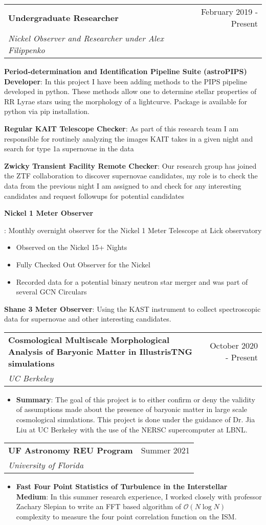 \documentclass[letterpaper,10pt]{article}
\makeatletter
\newcommand{\resumeItem}[2]{
  \item\small{
    \textbf{#1}{: #2 \vspace{-2pt}}
  }
}
\newcommand{\resumeSubheading}[4]{
  \vspace{-1pt}\item[]
  \begin{tabular*}{0.98\textwidth}{l@{\extracolsep{\fill}}r}
      \hspace{-10pt}\textbf{#1} & #2 \\
      \hspace{-10pt}\textit{\small#3} & \textit{\small #4} \\
    \end{tabular*}\vspace{-5pt}
}
\newcommand{\resumeItemListStart}{\begin{itemize}}
\newcommand{\resumeItemListEnd}{\end{itemize}\vspace{-5pt}}
\makeatother
\begin{document}
    \resumeSubheading
      {Undergraduate Researcher}{February 2019 - Present}
      {Nickel Observer and Researcher under Alex Filippenko}{}
      \resumeItemListStart
        \resumeItem{Period-determination and Identification Pipeline Suite (astroPIPS) Developer}{In this project I have been adding methods to the PIPS pipeline developed in python. These methods allow one to determine stellar properties of RR Lyrae stars using the morphology of a lightcurve. Package is available for python via pip installation.}
        \resumeItem{Regular KAIT Telescope Checker}
          {As part of this research team I am responsible for routinely analyzing the images KAIT takes in a given night and search for type 1a supernovae in the data}
        \resumeItem{Zwicky Transient Facility Remote Checker}
            {Our research group has joined the ZTF collaboration to discover supernovae candidates, my role is to check the data from the previous night I am assigned to and check for any interesting candidates and request followups for potential candidates}
        \resumeItem{Nickel 1 Meter Observer}
          {Monthly overnight observer for the Nickel 1 Meter Telescope at Lick observatory
            \begin{itemize}
                \item Observed on the Nickel 15+ Nights
                \item Fully Checked Out Observer for the Nickel
                \item Recorded data for a potential binary neutron star merger and was part of several GCN Circulars
            \end{itemize}
        \resumeItem{Shane 3 Meter Observer}
            {Using the KAST instrument to collect spectroscopic data for supernovae and other interesting candidates.}
          }
      \resumeItemListEnd

      \resumeSubheading
        {Cosmological Multiscale Morphological Analysis of Baryonic Matter in IllustrisTNG simulations}{October 2020 - Present}{UC Berkeley}{}
        \resumeItemListStart
            \resumeItem{Summary}
                {The goal of this project is to either confirm or deny the validity of assumptions made about the presence of baryonic matter in large scale cosmological simulations. This project is done under the guidance of Dr. Jia Liu at UC Berkeley with the use of the NERSC supercomputer at LBNL.}
        \resumeItemListEnd
        
     \resumeSubheading
        {UF Astronomy REU Program}{Summer 2021}{University of Florida}{}
        \resumeItemListStart
            \resumeItem{Fast Four Point Statistics of Turbulence in the Interstellar Medium}
                {In this summer research experience, I worked closely with professor Zachary Slepian to write an FFT based algorithm of $\mathcal{O}(N\log N)$ complexity to measure the four point correlation function on the ISM.}
        \resumeItemListEnd    
    
\end{document}
